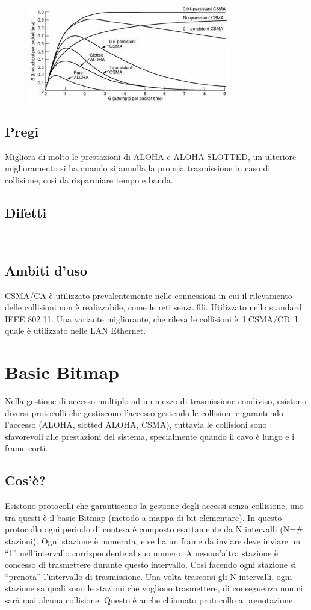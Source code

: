 \begin{figure}[H]
\centering
\includegraphics[scale=1]{res/img/23_CSMA.png}
\end{figure}

\subsection{Pregi}
Migliora di molto le prestazioni di ALOHA e ALOHA-SLOTTED, un ulteriore miglioramento si ha quando si annulla la propria trasmissione in caso di collisione, cosi da risparmiare tempo e banda.

\subsection{Difetti}
--

\subsection{Ambiti d'uso}
CSMA/CA è utilizzato prevalentemente nelle connessioni in cui il rilevamento delle collisioni non è realizzabile, come le reti senza fili.
Utilizzato nello standard IEEE 802.11.
Una variante migliorante, che rileva le collisioni è il CSMA/CD il quale è utilizzato nelle LAN Ethernet.

\section{Basic Bitmap}

Nella gestione di accesso multiplo ad un mezzo di trasmissione condiviso, esistono diversi protocolli che gestiscono l'accesso gestendo le collisioni e garantendo l'accesso (ALOHA, slotted ALOHA, CSMA), tuttavia le collisioni sono sfavorevoli alle prestazioni del sistema, specialmente quando il cavo è lungo e i frame corti.
\subsection{Cos'è?}
Esistono protocolli che garantiscono la gestione degli accessi senza collisione, uno tra questi è il basic Bitmap (metodo a mappa di bit elementare). In questo protocollo ogni periodo di contesa è composto esattamente da N intervalli (N=\# stazioni). Ogni stazione è numerata, e se ha un frame da inviare deve inviare un “1” nell'intervallo corrispondente al suo numero. A nessun'altra stazione è concesso di trasmettere durante questo intervallo. Cosi facendo ogni stazione si “prenota” l'intervallo di trasmissione. Una volta trascorsi gli N intervalli, ogni stazione sa quali sono le stazioni che vogliono trasmettere, di conseguenza non ci sarà mai alcuna collisione.
Questo è anche chiamato protocollo a prenotazione.


